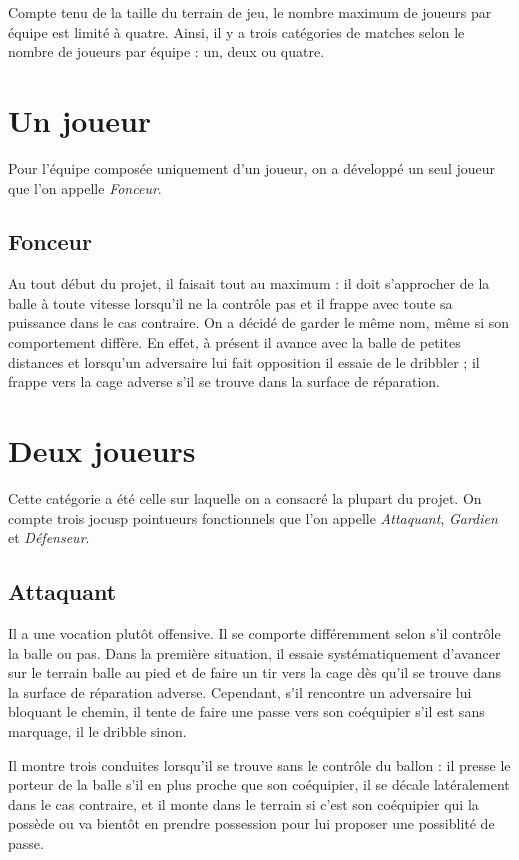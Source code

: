 \documentclass[12pt,a4paper]{article}
\begin{document}
Compte tenu de la taille du terrain de jeu, le nombre maximum de joueurs par 
\'equipe est limit\'e \`a quatre. Ainsi, il y a trois cat\'egories de matches 
selon le nombre de joueurs par \'equipe : un, deux ou quatre.

\section{Un joueur}
Pour l'\'equipe compos\'ee uniquement d'un joueur, on a d\'evelopp\'e un seul 
joueur que l'on appelle {\itshape Fonceur}. 

\subsection*{Fonceur}
Au tout d\'ebut du projet, il faisait tout au maximum : il doit 
s'approcher de la balle \`a toute vitesse lorsqu'il ne la contr\^ole pas et il 
frappe avec toute sa puissance dans le cas contraire. On a d\'ecid\'e de garder le 
m\^eme nom, m\^eme si son comportement diff\`ere. En effet, \`a pr\'esent il 
avance avec la balle de petites distances et lorsqu'un adversaire lui fait 
opposition il essaie de le dribbler ; il frappe vers la cage adverse s'il se 
trouve dans la surface de r\'eparation. 

\section{Deux joueurs}
Cette cat\'egorie a \'et\'e celle sur laquelle on a consacr\'e la plupart du 
projet. On compte trois jocusp pointueurs fonctionnels que l'on appelle 
{\itshape Attaquant}, {\itshape Gardien} et {\itshape D\'efenseur}. 

\subsection*{Attaquant}
Il a une vocation plut\^ot offensive. Il se comporte diff\'eremment selon 
s'il contr\^ole la balle ou pas. Dans la premi\`ere situation, il essaie 
syst\'ematiquement d'avancer sur le terrain balle au pied et de faire un tir 
vers la cage d\`es qu'il se trouve dans la surface de r\'eparation adverse. 
Cependant, s'il rencontre un adversaire lui bloquant le chemin, il tente de 
faire une passe vers son co\'equipier s'il est sans marquage, il le 
dribble sinon. 

Il montre trois conduites lorsqu'il se trouve sans le 
contr\^ole du ballon : il presse le porteur de la balle s'il en plus 
proche que son co\'equipier, il se d\'ecale lat\'eralement dans le cas 
contraire, et il monte dans le terrain si c'est son co\'equipier qui la 
poss\`ede ou va bient\^ot en prendre possession pour lui proposer une 
possiblit\'e de passe.
\end{document}
